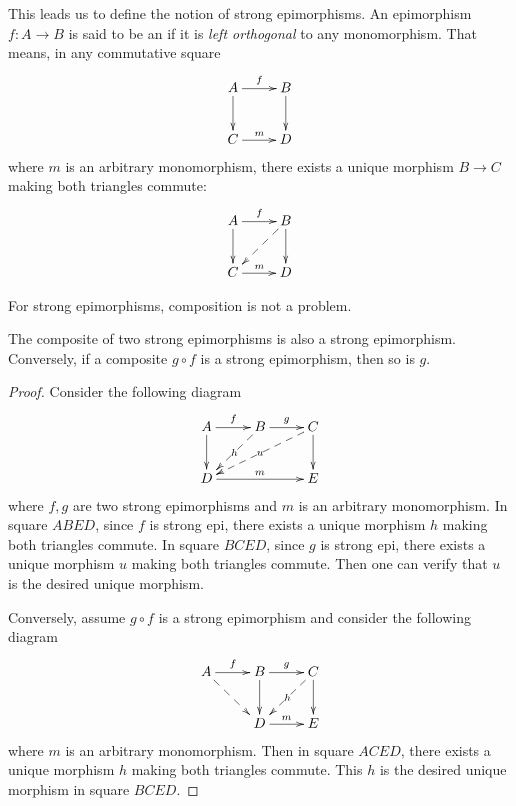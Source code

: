   This leads us to define the notion of strong epimorphisms. An epimorphism $f\colon A\to B$ is said to be an  if it is \emph{left orthogonal} to any monomorphism. That means, in any commutative square
        \begin{displaymath}
          \xymatrix{
            A\ar[r]^{f}\ar[d]&B\ar[d]\\
            C\ar[r]^{m}&D
          }
        \end{displaymath}
  where $m$ is an arbitrary monomorphism, there exists a unique morphism $B\to C$ making both triangles commute:
        \begin{displaymath}
          \xymatrix{
            A\ar[r]^{f}\ar[d]&B\ar[d]\ar@{-->}[dl]\\
            C\ar[r]^{m}&D
          }
        \end{displaymath}

  For strong epimorphisms, composition is not a problem.
  \begin{prop}
    The composite of two strong epimorphisms is also a strong epimorphism. Conversely, if a composite $g\circ f$ is a strong epimorphism, then so is $g$.
  \end{prop}
  \begin{proof}
    Consider the following diagram
        \begin{displaymath}
          \xymatrix{
            A\ar[r]^{f}\ar[d]&B\ar[r]^{g}\ar@{-->}[dl]|-{h}&C\ar[d]\ar@{-->}[dll]|-{u}\\
            D\ar[rr]^{m}&&E
          }
        \end{displaymath}
    where $f,g$ are two strong epimorphisms and $m$ is an arbitrary monomorphism. In square $ABED$, since $f$ is strong epi, there exists a unique morphism $h$ making both triangles commute. In square $BCED$, since $g$ is strong epi, there exists a unique morphism $u$ making  both triangles commute. Then one can verify that $u$ is the desired unique morphism.

    Conversely, assume $g\circ f$ is a strong epimorphism and consider the following diagram
        \begin{displaymath}
          \xymatrix{
            A\ar[r]^{f}\ar@{-->}[dr]&B\ar[d]\ar[r]^{g}&C\ar[d]\ar@{-->}[dl]|-{h}\\
            &D\ar[r]^{m}&E
          }
        \end{displaymath}
    where $m$ is an arbitrary monomorphism. Then in square $ACED$, there exists a unique morphism $h$ making both triangles commute. This $h$ is the desired unique morphism in square $BCED$.
  \end{proof}

